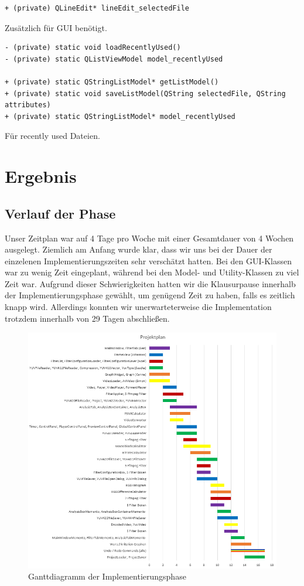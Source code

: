 \documentclass{scrartcl}
\begin{document}
{\begin{verbatim}
+ (private) QLineEdit* lineEdit_selectedFile
\end{verbatim}
Zusätzlich für GUI benötigt.
\bigskip
\begin{verbatim}
- (private) static void loadRecentlyUsed()
- (private) static QListViewModel model_recentlyUsed

+ (private) static QStringListModel* getListModel()
+ (private) static void saveListModel(QString selectedFile, QString attributes)
+ (private) static QStringListModel* model_recentlyUsed
\end{verbatim}
Für recently used Dateien.
\newpage
\section{Ergebnis}
\subsection{Verlauf der Phase} 
\bigskip
Unser Zeitplan war auf 4 Tage pro Woche mit einer Gesamtdauer von 4 Wochen ausgelegt. Ziemlich am Anfang wurde klar, dass wir uns bei der Dauer der einzelenen Implementierungszeiten sehr verschätzt hatten. Bei den GUI-Klassen war zu wenig Zeit eingeplant, während bei den Model- und Utility-Klassen zu viel Zeit war. Aufgrund dieser Schwierigkeiten hatten wir die Klausurpause innerhalb der Implementierungsphase gewählt, um genügend Zeit zu haben, falls es zeitlich knapp wird. Allerdings konnten wir unerwarteterweise die Implementation trotzdem innerhalb von 29 Tagen abschließen.
\begin{figure}[ht]
\centering
\includegraphics[width=1.0\textwidth]{Pictures/gantt.png}
\caption{Ganttdiagramm der Implementierungsphase}
\end{figure}
\newpage
}
\end{document}
